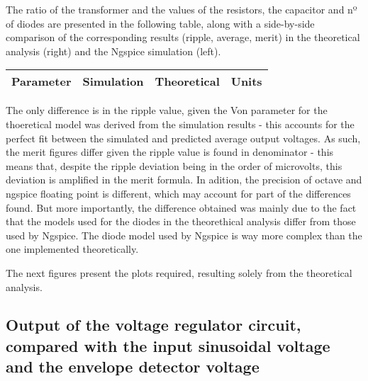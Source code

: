 The ratio of the transformer and the values of the resistors, the capacitor and nº of diodes are presented in the following table, along with a side-by-side comparison of the corresponding results (ripple, average, merit) in the theoretical analysis (right) and the Ngspice simulation (left).

\hfill
 \parbox{1\linewidth}{
  \centering
  \begin{tabular}{|l|l|l|r|}
    \hline    
    {\bf Parameter} & {\bf Simulation} & {\bf Theoretical } & {\bf Units }\\ \hline
    
  \end{tabular}
  \label{tab:results}
    

  }
    The only difference is in the ripple value, given the Von parameter for the thoeretical model was derived from the simulation results - this accounts for the perfect fit between the simulated and predicted average output voltages. As such, the merit figures differ given the ripple value is found in denominator - this means that, despite the ripple deviation being in the order of microvolts, this deviation is amplified in the merit formula. In adition, the precision of octave and ngspice floating point is different, which may account for part of the differences found. But more importantly, the difference obtained was mainly due to the fact that the models
used for the diodes in the theorethical analysis differ from those used by Ngspice. The diode
model used by Ngspice is way more complex than the one implemented theoretically.
  
  The next figures present the plots required, resulting solely from the theoretical analysis.




\subsection{Output of the voltage regulator circuit, compared with the input sinusoidal voltage and the envelope detector voltage}


